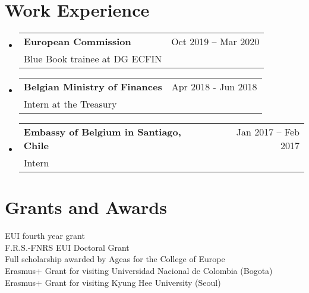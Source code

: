 \documentclass[11pt]{article}
\makeatletter
\newcommand{\CVItem}[1]{
  \item\small{
    {#1 \vspace{-2pt}}
  }
}
\newcommand{\CVSubheading}[4]{
  \vspace{-2pt}\item
    \begin{tabular*}{0.97\textwidth}[t]{l@{\extracolsep{\fill}}r}
      \textbf{#1} & #2 \\
      \small#3 & \small #4 \\
    \end{tabular*}\vspace{-7pt}
}
\newcommand{\CVSubHeadingListStart}{\begin{itemize}[leftmargin=0.5cm, label={}]}
\newcommand{\CVSubHeadingListEnd}{\end{itemize}}
\newcommand{\CVItemListStart}{\begin{itemize}}
\newcommand{\CVItemListEnd}{\end{itemize}\vspace{-5pt}}
\makeatother
\begin{document}

\section{Work Experience}
  \CVSubHeadingListStart
    \CVSubheading
      {European Commission}{Oct 2019 -- Mar 2020}
      {Blue Book trainee at DG ECFIN}{}
    \CVSubheading
      {Belgian Ministry of Finances}{Apr 2018 - Jun 2018}
      {Intern at the Treasury}{}
    \CVSubheading
      {Embassy of Belgium in Santiago, Chile}{Jan 2017 -- Feb 2017}
      {Intern}{}
  \CVSubHeadingListEnd





\section{Grants and Awards}
 \begin{itemize}[leftmargin=0.5cm, label={}]
    \small{\item{
EUI fourth year grant \\
 F.R.S.-FNRS EUI Doctoral Grant\\
Full scholarship awarded by Ageas for the College of Europe\\
Erasmus+ Grant for visiting Universidad Nacional de Colombia (Bogota) \\
Erasmus+ Grant for visiting Kyung Hee University (Seoul)
    }}
 \end{itemize}

\end{document}
